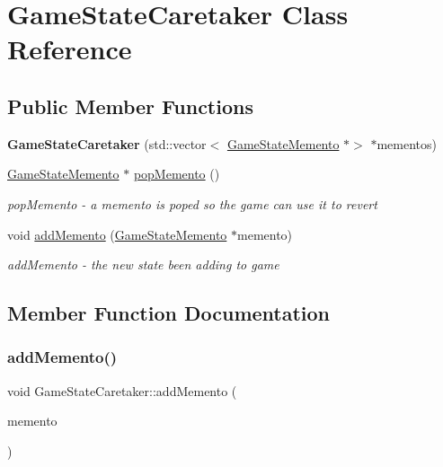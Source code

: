 \hypertarget{class_game_state_caretaker}{}\section{Game\+State\+Caretaker Class Reference}
\label{class_game_state_caretaker}
\subsection*{Public Member Functions}
\begin{DoxyCompactItemize}
\item 
\mbox{\label{class_game_state_caretaker_a64dd43c437942c28f605279659224dbd}} 
{\bfseries Game\+State\+Caretaker} (std\+::vector$<$ \mbox{\hyperlink{class_game_state_memento}{Game\+State\+Memento}} $\ast$$>$ $\ast$mementos)
\item 
\mbox{\hyperlink{class_game_state_memento}{Game\+State\+Memento}} $\ast$ \mbox{\hyperlink{class_game_state_caretaker_a7f9344fa69b23a93da6d9ba345351d1b}{pop\+Memento}} ()
\begin{DoxyCompactList}\small\item\em pop\+Memento -\/ a memento is poped so the game can use it to revert \end{DoxyCompactList}\item 
void \mbox{\hyperlink{class_game_state_caretaker_a6663e4b7c5ecd228848cb723602c7901}{add\+Memento}} (\mbox{\hyperlink{class_game_state_memento}{Game\+State\+Memento}} $\ast$memento)
\begin{DoxyCompactList}\small\item\em add\+Memento -\/ the new state been adding to game \end{DoxyCompactList}\end{DoxyCompactItemize}


\subsection{Member Function Documentation}
\mbox{\label{class_game_state_caretaker_a6663e4b7c5ecd228848cb723602c7901}} 
\subsubsection{\texorpdfstring{add\+Memento()}{addMemento()}}
{\footnotesize\ttfamily void Game\+State\+Caretaker\+::add\+Memento (\begin{DoxyParamCaption}\item[{\mbox{\hyperlink{class_game_state_memento}{Game\+State\+Memento}} $\ast$}]{memento }\end{DoxyParamCaption})}



